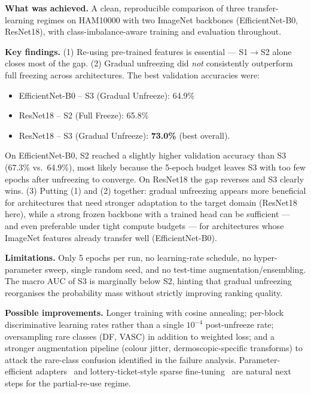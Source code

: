 \documentclass{article}
\begin{document}
\textbf{What was achieved.} A clean, reproducible comparison of three
transfer-learning regimes on HAM10000 with two ImageNet backbones
(EfficientNet-B0, ResNet18), with class-imbalance-aware training and
evaluation throughout.

\textbf{Key findings.} (1) Re-using pre-trained features is essential ---
S1$\to$S2 alone closes most of the gap. (2) Gradual unfreezing did
\emph{not} consistently outperform full freezing across architectures. The
best validation accuracies were:
\begin{itemize}
  \item EfficientNet-B0 -- S3 (Gradual Unfreeze): 64.9\%
  \item ResNet18 -- S2 (Full Freeze): 65.8\%
  \item ResNet18 -- S3 (Gradual Unfreeze): \textbf{73.0\%} (best overall).
\end{itemize}
On EfficientNet-B0, S2 reached a slightly higher validation accuracy than S3
(67.3\% vs.\ 64.9\%), most likely because the 5-epoch budget leaves S3 with
too few epochs after unfreezing to converge. On ResNet18 the gap reverses
and S3 clearly wins. (3) Putting (1) and (2) together: gradual unfreezing
appears more beneficial for architectures that need stronger adaptation to
the target domain (ResNet18 here), while a strong frozen backbone with a
trained head can be sufficient --- and even preferable under tight compute
budgets --- for architectures whose ImageNet features already transfer well
(EfficientNet-B0).

\textbf{Limitations.} Only 5 epochs per run, no learning-rate schedule, no
hyper-parameter sweep, single random seed, and no test-time
augmentation/ensembling. The macro AUC of S3 is marginally below S2, hinting
that gradual unfreezing reorganises the probability mass without strictly
improving ranking quality.

\textbf{Possible improvements.} Longer training with cosine annealing;
per-block discriminative learning rates rather than a single $10^{-4}$
post-unfreeze rate; oversampling rare classes (DF, VASC) in addition to
weighted loss; and a stronger augmentation pipeline (colour jitter,
dermoscopic-specific transforms) to attack the rare-class confusion
identified in the failure analysis. Parameter-efficient
adapters~\cite{hu2021lora} and lottery-ticket-style sparse
fine-tuning~\cite{frankle2019lottery,morcos2019oneticket} are natural next
steps for the partial-re-use regime.

{\small


}
\end{document}
